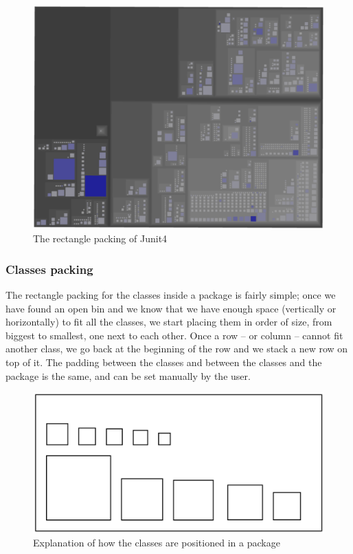 \documentclass[]{usiinfbachelorproject}
\begin{document}
\begin{figure} [H]
\centering
\includegraphics[width=.7\textwidth]{pictures/junit4Above.png}
\caption{The rectangle packing of Junit4}
\label{fig:rectanglePacking}
\end{figure}

\subsubsection{Classes packing} \label{Classes packing}
The rectangle packing for the classes inside a package is fairly simple; once we have found an open bin and we know that we have enough space (vertically or horizontally) to fit all the classes, we start placing them in order of size, from biggest to smallest, one next to each other. Once a row -- or column -- cannot fit another class, we go back at the beginning of the row and we stack a new row on top of it. The padding between the classes and between the classes and the package is the same, and can be set manually by the user.

\begin{figure} [H]
\centering
\includegraphics[width=.7\textwidth]{pictures/classPacking.png}
\caption{Explanation of how the classes are positioned in a package}
\label{fig:classesPacking}
\end{figure}

\end{document}
